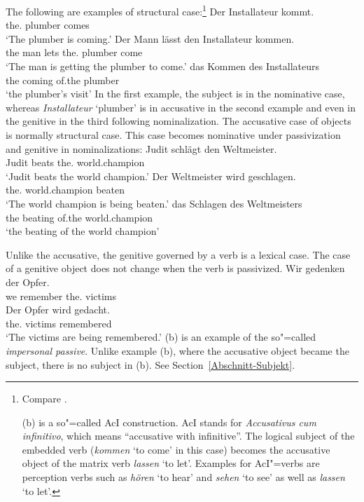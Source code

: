 The following are examples of structural case:\footnote{%
        Compare .

		(b) is a so"=called AcI construction. AcI stands for \emph{Accusativus cum infinitivo}, which means ``accusative
		with infinitive''. The logical subject of the embedded verb (\emph{kommen} `to come'
                in this case) becomes the accusative object of the matrix verb \emph{lassen} `to let'.
		Examples for AcI"=verbs are perception verbs such as \emph{hören} `to hear' and \emph{sehen} `to see'
		as well as \emph{lassen} `to let'.
}
\eal
\ex 
\gll Der Installateur kommt.\\
	 the.\nom{} plumber comes\\
\glt `The plumber is coming.'
\ex 
\gll Der Mann lässt den Installateur kommen.\\
	 the man lets the.\acc{} plumber come\\
\glt `The man is getting the plumber to come.'
\ex 
\gll das Kommen des Installateurs\\
	 the coming of.the plumber\\
\glt `the plumber's visit'
\zl
In the first example, the subject is in the nominative case, whereas \emph{Installateur} `plumber' is
in accusative in the second example and even in the genitive in the third following nominalization.
The accusative case of objects is normally structural case. This case becomes nominative under
passivization and genitive in nominalizations:
\eal
\ex 
\gll Judit schlägt den Weltmeister.\\
     Judit beats the.\acc{} world.champion\\
\glt `Judit beats the world champion.'
\ex 
\gll Der        Weltmeister    wird geschlagen.\\
     the.\nom{} world.champion \AUX{} beaten\\
\glt `The world champion is being beaten.'
\ex
\gll das Schlagen des Weltmeisters\\
      the beating  of.the world.champion\\
\glt `the beating of the world champion'
\zl

\noindent
Unlike the accusative, the genitive governed by a verb is a lexical case. The case of a genitive object does not change when
the verb is passivized.
\eal
\ex
\gll Wir gedenken der Opfer.\\
     we remember the.\gen{} victims\\
\ex 
\gll Der        Opfer   wird   gedacht.\\
     the.\gen{} victims \AUX{} remembered\\
\glt `The victims are being remembered.'
\zl
(b) is an example of the so"=called \emph{impersonal passive}. Unlike example (b), where the accusative
object became the subject, there is no subject in (b). See Section~\ref{Abschnitt-Subjekt}.

